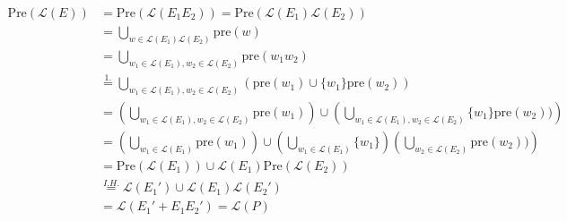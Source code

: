 \documentclass{article}
\theoremstyle{remark}
\numberwithin{equation}{section}
\begin{document}
	\begin{align*}
	\text{Pre} (\mathcal{L}(E)) &= \text{Pre} (\mathcal{L} (E_{1}E_{2}))
	= \text{Pre}(\mathcal{L}(E_{1})\mathcal{L}(E_{2}))\\
	&=\bigcup_{w\in \mathcal{L}(E_1)\mathcal{L}(E_2)} \text{pre}(w)
	\\&= \bigcup_{w_{1}\in \mathcal{L}(E_{1}),w_{2} \in \mathcal{L}(E_{2})} \text{pre}(w_{1}w_{2})\\
	&\stackrel{1.}{=}  \bigcup_{w_{1}\in \mathcal{L}(E_{1}),w_{2} \in \mathcal{L}(E_{2})}( \text{pre} (w_{1}) \cup \{w_{1}\}\text{pre}(w_{2}))\\
	&= \left(\bigcup_{w_{1}\in \mathcal{L}(E_{1}),w_{2} \in \mathcal{L}(E_{2})}\text{pre} (w_{1})\right) \cup \left(\bigcup_{w_{1}\in \mathcal{L}(E_{1}),w_{2} \in \mathcal{L}(E_{2})} \{w_{1}\}\text{pre}(w_{2})) \right) \\
	&= \left(\bigcup_{w_{1}\in \mathcal{L}(E_{1})}\text{pre} (w_{1})\right) \cup \left(\bigcup_{w_{1}\in \mathcal{L}(E_{1})} \{w_{1}\}\right)\left( \bigcup_{w_{2} \in \mathcal{L}(E_{2})} \text{pre}(w_{2})) \right) \\
	&= \text{Pre}(\mathcal{L}(E_{1})) \cup \mathcal{L}(E_{1})\text{Pre}(\mathcal{L}(E_{2}))\\
	&\stackrel{I.H.}{=}\mathcal{L}(E_{1}') \cup \mathcal{L}(E_{1})\mathcal{L}(E_{2}')\\
	&=\mathcal{L}(E_{1}'+E_{1}E_{2}')=\mathcal{L}(P)
	\end{align*}
	
\end{document}
